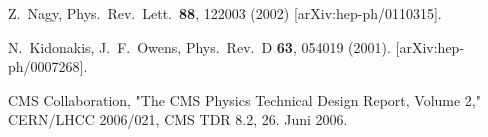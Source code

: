 \begin{thebibliography}{19}
  Z.~Nagy,
  Phys.\ Rev.\ Lett.\  {\bf 88}, 122003 (2002)
  [arXiv:hep-ph/0110315].



  N.~Kidonakis, J.~F.~Owens,
  Phys.\ Rev.\ D {\bf 63}, 054019 (2001).
  [arXiv:hep-ph/0007268].


  CMS Collaboration, 
  "The CMS Physics Technical Design Report, Volume 2,"
  CERN/LHCC 2006/021, CMS TDR 8.2, 26. Juni 2006.


 
\end{thebibliography}

